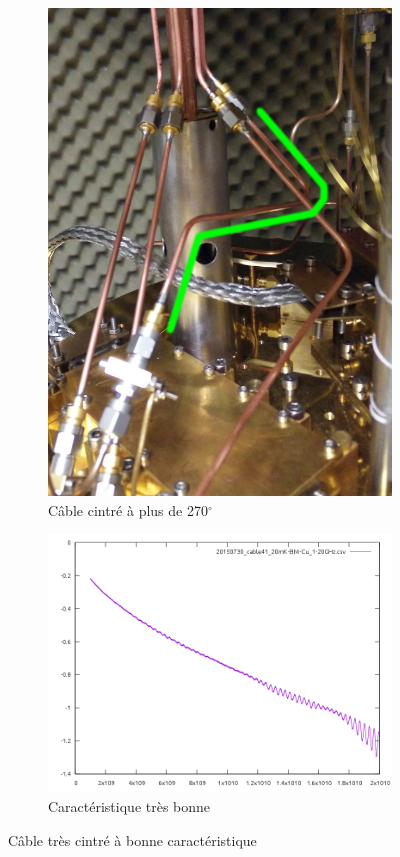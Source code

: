 \begin{figure}[h]
    \centering
    \begin{subfigure}[t]{0.40\textwidth}
        \centering
        \includegraphics[height=1.1\textwidth]{Images/Coax/Tres_cintre}
        \caption{Câble cintré à plus de 270$^\circ$ }
    \end{subfigure}%
    \begin{subfigure}[t]{0.6\textwidth}
        \centering
        \includegraphics[width=1.0\textwidth]{Images/Caracs/Tres_cintre}
        \caption{Caractéristique très bonne}
    \end{subfigure}
    \caption{Câble très cintré à bonne caractéristique}
\end{figure}

